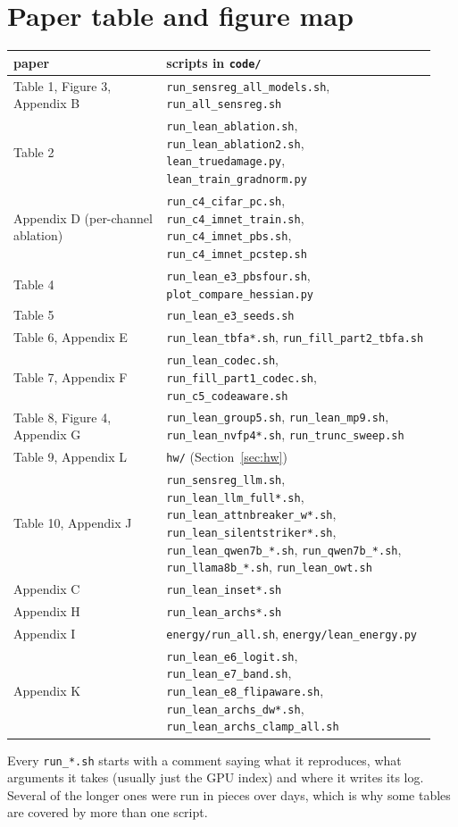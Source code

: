 \documentclass[11pt]{article}
\begin{document}
\section{Paper table and figure map}
\begin{center}\small
\begin{tabular}{p{0.34\linewidth}p{0.6\linewidth}}
\toprule
paper & scripts in \texttt{code/} \\
\midrule
Table 1, Figure 3, Appendix B & \texttt{run\_sensreg\_all\_models.sh}, \texttt{run\_all\_sensreg.sh} \\
Table 2 & \texttt{run\_lean\_ablation.sh}, \texttt{run\_lean\_ablation2.sh}, \texttt{lean\_truedamage.py}, \texttt{lean\_train\_gradnorm.py} \\
Appendix D (per-channel ablation) & \texttt{run\_c4\_cifar\_pc.sh}, \texttt{run\_c4\_imnet\_train.sh}, \texttt{run\_c4\_imnet\_pbs.sh}, \texttt{run\_c4\_imnet\_pcstep.sh} \\
Table 4 & \texttt{run\_lean\_e3\_pbsfour.sh}, \texttt{plot\_compare\_hessian.py} \\
Table 5 & \texttt{run\_lean\_e3\_seeds.sh} \\
Table 6, Appendix E & \texttt{run\_lean\_tbfa*.sh}, \texttt{run\_fill\_part2\_tbfa.sh} \\
Table 7, Appendix F & \texttt{run\_lean\_codec.sh}, \texttt{run\_fill\_part1\_codec.sh}, \texttt{run\_c5\_codeaware.sh} \\
Table 8, Figure 4, Appendix G & \texttt{run\_lean\_group5.sh}, \texttt{run\_lean\_mp9.sh}, \texttt{run\_lean\_nvfp4*.sh}, \texttt{run\_trunc\_sweep.sh} \\
Table 9, Appendix L & \texttt{hw/} (Section~\ref{sec:hw}) \\
Table 10, Appendix J & \texttt{run\_sensreg\_llm.sh}, \texttt{run\_lean\_llm\_full*.sh}, \texttt{run\_lean\_attnbreaker\_w*.sh}, \texttt{run\_lean\_silentstriker*.sh}, \texttt{run\_lean\_qwen7b\_*.sh}, \texttt{run\_qwen7b\_*.sh}, \texttt{run\_llama8b\_*.sh}, \texttt{run\_lean\_owt.sh} \\
Appendix C & \texttt{run\_lean\_inset*.sh} \\
Appendix H & \texttt{run\_lean\_archs*.sh} \\
Appendix I & \texttt{energy/run\_all.sh}, \texttt{energy/lean\_energy.py} \\
Appendix K & \texttt{run\_lean\_e6\_logit.sh}, \texttt{run\_lean\_e7\_band.sh}, \texttt{run\_lean\_e8\_flipaware.sh}, \texttt{run\_lean\_archs\_dw*.sh}, \texttt{run\_lean\_archs\_clamp\_all.sh} \\
\bottomrule
\end{tabular}
\end{center}
Every \texttt{run\_*.sh} starts with a comment saying what it reproduces, what arguments it takes (usually just the GPU index) and where it writes its log. Several of the longer ones were run in pieces over days, which is why some tables are covered by more than one script.
\end{document}
